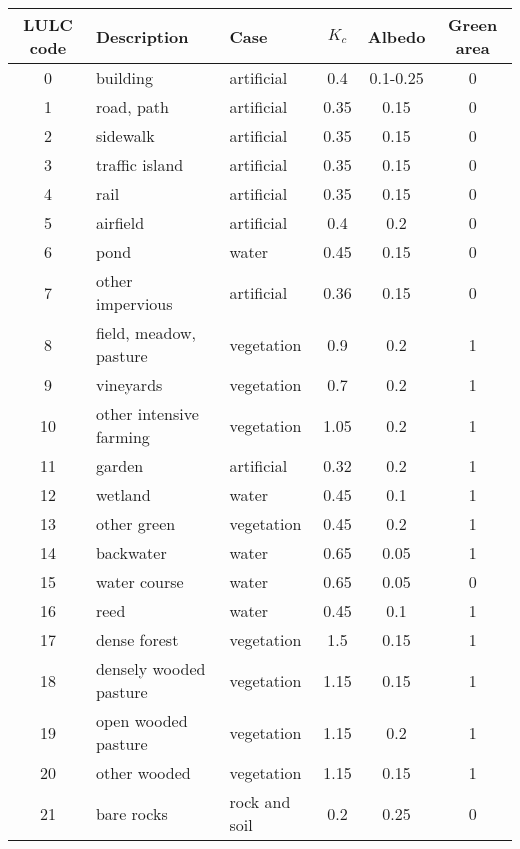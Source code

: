\documentclass[10pt,letterpaper]{article}
\begin{document}
\begin{table}[H]
  \begin{adjustwidth}{-.02\textwidth}{0cm}  
    \begin{center}
      \begin{tabular}{ c p{} p{} c c c }
        \toprule
        LULC code & Description & Case & $K_c$ & Albedo & Green area \\
        \midrule
        0 & building & artificial & 0.4 & 0.1-0.25 & 0 \\ %
        1 & road, path & artificial & 0.35 & 0.15 & 0 \\ %
        2 & sidewalk & artificial & 0.35 & 0.15 & 0 \\
        3 & traffic island & artificial & 0.35 & 0.15 & 0 \\
        4 & rail & artificial & 0.35 & 0.15 & 0 \\
        5 & airfield & artificial & 0.4 & 0.2 & 0 \\
        6 & pond & water & 0.45 & 0.15 & 0 \\
        7 & other impervious & artificial & 0.36 & 0.15 & 0 \\
        8 & field, meadow, pasture & vegetation & 0.9 & 0.2 & 1 \\
        9 & vineyards & vegetation & 0.7 & 0.2 & 1 \\
        10 & other intensive farming & vegetation & 1.05 & 0.2 & 1 \\
        11 & garden & artificial & 0.32 & 0.2 & 1 \\
        12 & wetland & water & 0.45 & 0.1 & 1 \\
        13 & other green & vegetation & 0.45 & 0.2 & 1 \\
        14 & backwater & water & 0.65 & 0.05 & 1 \\
        15 & water course & water & 0.65 & 0.05 & 0\\
        16 & reed & water & 0.45 & 0.1 & 1\\
        17 & dense forest & vegetation & 1.5 & 0.15 & 1 \\
        18 & densely wooded pasture & vegetation & 1.15 & 0.15 & 1 \\
        19 & open wooded pasture & vegetation & 1.15 & 0.2 & 1 \\
        20 & other wooded & vegetation & 1.15 & 0.15 & 1\\
        21 & bare rocks & rock and soil & 0.2 & 0.25 & 0 \\

\end{tabular}
\end{center}
\end{adjustwidth}
\end{table}
\end{document}
